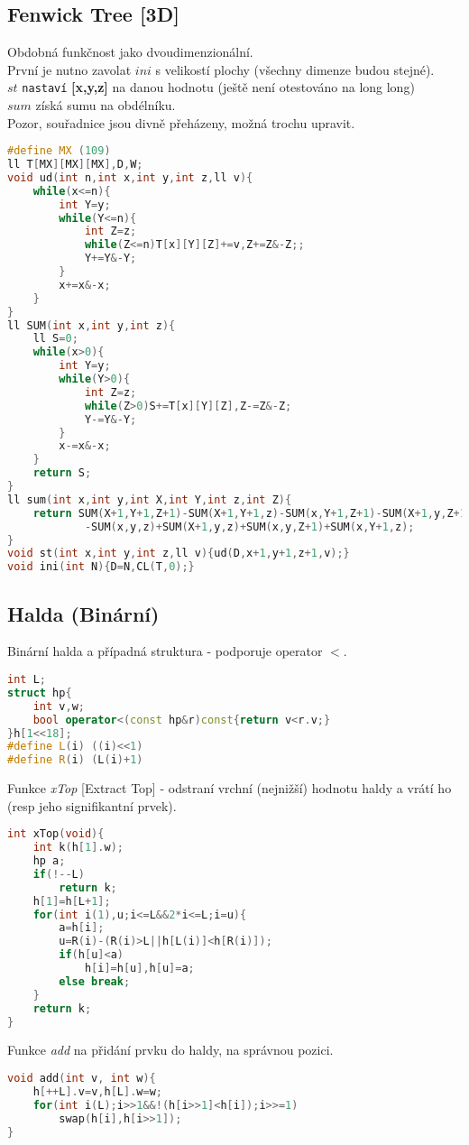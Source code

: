 \documentclass[11pt]{article}
\begin{document}
\subsection{Fenwick Tree [3D]}
Obdobná funkčnost jako dvoudimenzionální.
\\První je nutno zavolat $ini$ s velikostí plochy (všechny dimenze budou stejné).
\\$st$ \texttt{nastaví} \textbf{[x,y,z]} na danou hodnotu (ještě není otestováno na long long)
\\$sum$ získá sumu na obdélníku.
\\Pozor, souřadnice jsou divně přeházeny, možná trochu upravit.
\begin{lstlisting}[language=C++]
#define MX (109)
ll T[MX][MX][MX],D,W;
void ud(int n,int x,int y,int z,ll v){
    while(x<=n){
        int Y=y;
        while(Y<=n){
            int Z=z;
            while(Z<=n)T[x][Y][Z]+=v,Z+=Z&-Z;;
            Y+=Y&-Y;
        }
        x+=x&-x;
    }
}
ll SUM(int x,int y,int z){
    ll S=0;
    while(x>0){
        int Y=y;
        while(Y>0){
            int Z=z;
            while(Z>0)S+=T[x][Y][Z],Z-=Z&-Z;
            Y-=Y&-Y;	
        }
        x-=x&-x;
    }
    return S;
}
ll sum(int x,int y,int X,int Y,int z,int Z){
    return SUM(X+1,Y+1,Z+1)-SUM(X+1,Y+1,z)-SUM(x,Y+1,Z+1)-SUM(X+1,y,Z+1)
    		-SUM(x,y,z)+SUM(X+1,y,z)+SUM(x,y,Z+1)+SUM(x,Y+1,z);
}
void st(int x,int y,int z,ll v){ud(D,x+1,y+1,z+1,v);}
void ini(int N){D=N,CL(T,0);}
\end{lstlisting}
\subsection{Halda (Binární)}
Binární halda a případná struktura - podporuje operator $<$.
\begin{lstlisting}[language=C++]
int L;
struct hp{
    int v,w;
    bool operator<(const hp&r)const{return v<r.v;}
}h[1<<18];
#define L(i) ((i)<<1)
#define R(i) (L(i)+1)
\end{lstlisting}
Funkce \textsl{xTop} [Extract Top] - odstraní vrchní (nejnižší) hodnotu haldy a vrátí ho (resp jeho signifikantní prvek).
\begin{lstlisting}[language=C++]
int xTop(void){
    int k(h[1].w);
    hp a;
    if(!--L)
        return k;
    h[1]=h[L+1];
    for(int i(1),u;i<=L&&2*i<=L;i=u){
        a=h[i];
        u=R(i)-(R(i)>L||h[L(i)]<h[R(i)]);
        if(h[u]<a)
            h[i]=h[u],h[u]=a;
        else break;
    }
    return k;
}
\end{lstlisting}
Funkce \textsl{add} na přidání prvku do haldy, na správnou pozici.
\begin{lstlisting}[language=C++]
void add(int v, int w){
    h[++L].v=v,h[L].w=w;
    for(int i(L);i>>1&&!(h[i>>1]<h[i]);i>>=1)
        swap(h[i],h[i>>1]);
}
\end{lstlisting}
\end{document}

